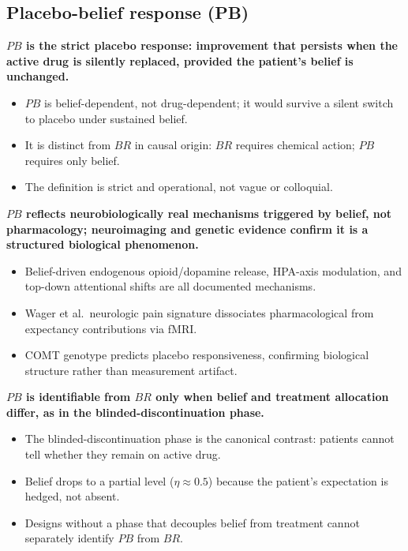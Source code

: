 \documentclass[
  11pt,
]{article}
\begin{document}
\subsection{Placebo-belief response (PB)}\label{placebo-belief-response-pb}

\textbf{$PB$ is the strict placebo response: improvement that persists when the active drug is silently replaced, provided the patient's belief is unchanged.}

\begin{itemize}\setlength{\itemsep}{2pt}\setlength{\parskip}{0pt}
\item $PB$ is belief-dependent, not drug-dependent; it would survive a silent switch to placebo under sustained belief.
\item It is distinct from $BR$ in causal origin: $BR$ requires chemical action; $PB$ requires only belief.
\item The definition is strict and operational, not vague or colloquial.
\end{itemize}

\textbf{$PB$ reflects neurobiologically real mechanisms triggered by belief, not pharmacology; neuroimaging and genetic evidence confirm it is a structured biological phenomenon.}

\begin{itemize}\setlength{\itemsep}{2pt}\setlength{\parskip}{0pt}
\item Belief-driven endogenous opioid/dopamine release, HPA-axis modulation, and top-down attentional shifts are all documented mechanisms.
\item Wager et al.\ neurologic pain signature dissociates pharmacological from expectancy contributions via fMRI.
\item COMT genotype predicts placebo responsiveness, confirming biological structure rather than measurement artifact.
\end{itemize}

\textbf{$PB$ is identifiable from $BR$ only when belief and treatment allocation differ, as in the blinded-discontinuation phase.}

\begin{itemize}\setlength{\itemsep}{2pt}\setlength{\parskip}{0pt}
\item The blinded-discontinuation phase is the canonical contrast: patients cannot tell whether they remain on active drug.
\item Belief drops to a partial level ($\eta \approx 0.5$) because the patient's expectation is hedged, not absent.
\item Designs without a phase that decouples belief from treatment cannot separately identify $PB$ from $BR$.
\end{itemize}
\end{document}
